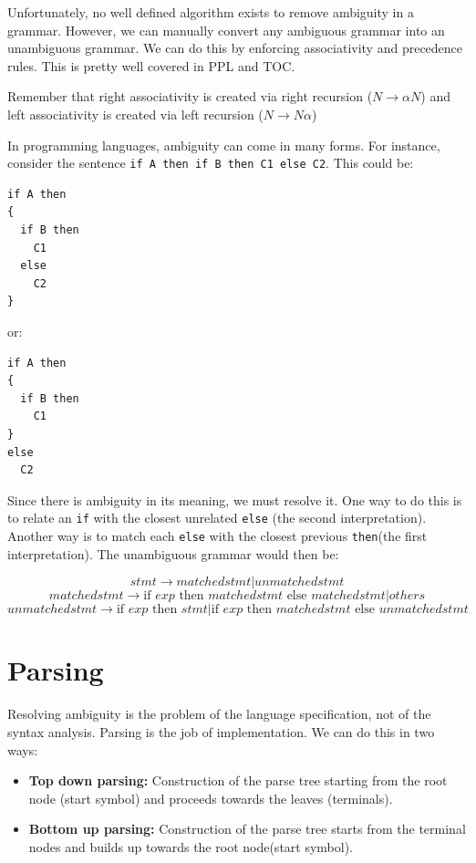 \documentclass[12pt,letterpaper]{book}
\theoremstyle{definition}
\begin{document}
Unfortunately, no well defined algorithm exists to remove ambiguity in a grammar. However, we can manually convert any ambiguous grammar into an unambiguous grammar. We can do this by enforcing associativity and precedence rules. This is pretty well covered in PPL and TOC.

Remember that right associativity is created via right recursion ($N \rightarrow \alpha N$) and left associativity is created via left recursion ($N \rightarrow N \alpha$)

In programming languages, ambiguity can come in many forms. For instance, consider the sentence \texttt{if A then if B then C1 else C2}.  This could be:

\begin{verbatim}
if A then 
{
  if B then
    C1
  else
    C2
}
\end{verbatim}

or:

\begin{verbatim}
if A then 
{
  if B then
    C1
}
else
  C2
\end{verbatim}

Since there is ambiguity in its meaning, we must resolve it. One way to do this is to relate an \texttt{if} with the closest unrelated \texttt{else} (the second interpretation). Another way is to match each \texttt{else} with the closest previous \texttt{then}(the first interpretation). The unambiguous grammar would then be:

\[stmt \rightarrow matchedstmt | unmatchedstmt\]
\[matchedstmt \rightarrow \text{if }exp \text{ then } matchedstmt \text{ else } matchedstmt | others\]
\[unmatchedstmt \rightarrow \text{if }exp \text{ then } stmt | \text{if }exp \text{ then } matchedstmt \text{ else } unmatchedstmt\]

\section{Parsing}

Resolving ambiguity is the problem of the language specification, not of the syntax analysis. Parsing is the job of implementation. We can do this in two ways:

\begin{itemize}
  \item \textbf{Top down parsing:} Construction of the parse tree starting from the root node (start symbol) and proceeds towards the leaves (terminals).
  \item \textbf{Bottom up parsing:} Construction of the parse tree starts from the terminal nodes and builds up towards the root node(start symbol).
\end{itemize}
\end{document}
